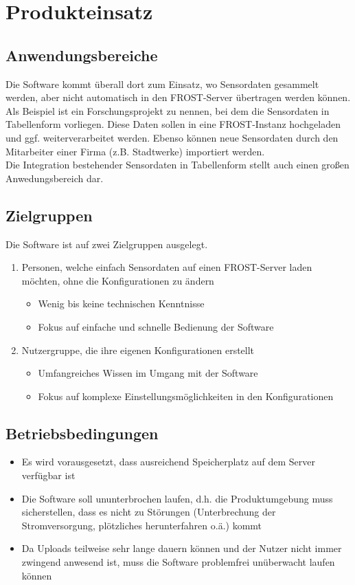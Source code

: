 \documentclass[a4paper, 12 pt]{article}
\begin{document}
\pagebreak
\section{Produkteinsatz}
\subsection{Anwendungsbereiche}
Die Software kommt überall dort zum Einsatz, wo Sensordaten gesammelt werden, aber nicht automatisch in den FROST-Server übertragen werden können.\\
Als Beispiel ist ein Forschungsprojekt zu nennen, bei dem die Sensordaten in Tabellenform vorliegen. Diese Daten sollen in eine FROST-Instanz hochgeladen und ggf. weiterverarbeitet werden. Ebenso können neue Sensordaten durch den Mitarbeiter einer Firma (z.B. Stadtwerke) importiert werden.\\
Die Integration bestehender Sensordaten in Tabellenform stellt auch einen großen Anwedungsbereich dar.
	

	\subsection{Zielgruppen}
	Die Software ist auf zwei Zielgruppen ausgelegt.\\
	\begin{enumerate}
		\item Personen, welche einfach Sensordaten auf einen FROST-Server laden möchten, ohne die Konfigurationen zu ändern
		
		\begin{itemize}
			\item Wenig bis keine technischen Kenntnisse
			\item Fokus auf einfache und schnelle Bedienung der Software
		\end{itemize}
		
		\item Nutzergruppe, die ihre eigenen Konfigurationen erstellt
		\begin{itemize}
			\item Umfangreiches Wissen im Umgang mit der Software
			\item Fokus auf komplexe Einstellungsmöglichkeiten in den Konfigurationen
		\end{itemize} 
	\end{enumerate}
	
\subsection{Betriebsbedingungen}
\begin{itemize}
	\item Es wird vorausgesetzt, dass ausreichend Speicherplatz auf dem Server verfügbar ist
	\item Die Software soll ununterbrochen laufen, d.h. die Produktumgebung muss sicherstellen, dass es nicht zu Störungen (Unterbrechung der Stromversorgung, plötzliches herunterfahren o.ä.) kommt
	\item Da Uploads teilweise sehr lange dauern können und der Nutzer nicht immer zwingend anwesend ist, muss die Software problemfrei unüberwacht laufen können
\end{itemize}
	
\end{document}
